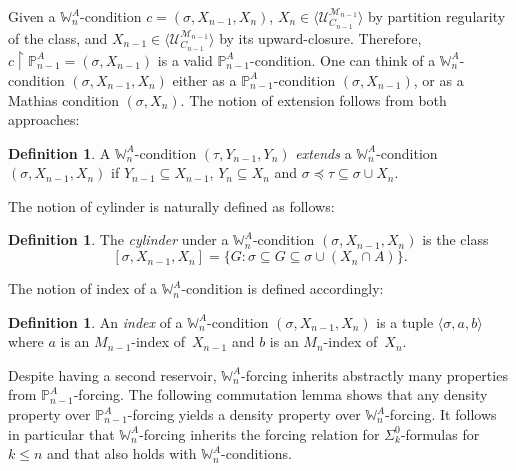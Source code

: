 \documentclass{article}
\def\PP{\mathbb{P}}
\def\WW{\mathbb{W}}
\def\U{\mathcal{U}}
\def\M{\mathcal{M}}
\def\PP{\mathbb{P}}
\newcommand{\uh}{\upharpoonright}
\numberwithin{theorem}{section}
\theoremstyle{definition}
\newtheorem{definition}[theorem]{Definition}
\begin{document}
Given a $\WW^A_n$-condition $c = (\sigma, X_{n-1}, X_n)$, $X_n \in \langle \U_{C_{n-1}}^{\M_{n-1}} \rangle$ by partition regularity of the class, and 
$X_{n - 1} \in \langle \U_{C_{n-1}}^{\M_{n-1}} \rangle$ by its upward-closure. Therefore, $c \uh {\PP^A_{n-1}} = (\sigma, X_{n-1})$ is a valid $\PP^A_{n-1}$-condition.
One can think of a $\WW^A_{n}$-condition $(\sigma, X_{n-1}, X_n)$ either as a $\PP^A_{n-1}$-condition $(\sigma, X_{n-1})$, or as a Mathias condition $(\sigma, X_n)$. The notion of extension follows from both approaches:

\begin{definition}
A $\WW^A_{n}$-condition $(\tau, Y_{n-1}, Y_n)$ \emph{extends} a $\WW^A_{n}$-condition $(\sigma, X_{n-1}, \allowbreak X_n)$
if $Y_{n-1} \subseteq X_{n-1}$, $Y_n \subseteq X_n$ and $\sigma \preceq \tau \subseteq \sigma \cup X_n$. 
\end{definition}

The notion of cylinder is naturally defined as follows:

\begin{definition}
The \emph{cylinder} under a $\WW^A_n$-condition $(\sigma, X_{n-1}, X_n)$ is the class
$$
[\sigma, X_{n-1}, X_n] = \{ G : \sigma \subseteq G \subseteq \sigma \cup (X_n \cap A) \}.
$$
\end{definition}

The notion of index of a $\WW^A_{n}$-condition is defined accordingly:

\begin{definition}
An \emph{index} of a $\WW^A_{n}$-condition $(\sigma, X_{n-1}, X_n)$ is a tuple $\langle \sigma, a, b\rangle$ where $a$ is an $M_{n-1}$-index of~$X_{n-1}$ and $b$ is an $M_n$-index of~$X_n$.
\end{definition}

Despite having a second reservoir, $\WW^A_{n}$-forcing inherits abstractly many proper\-ties from $\PP^A_{n-1}$-forcing. The following commutation lemma shows that any density property over $\PP^A_{n-1}$-forcing yields a density property over $\WW^A_{n}$-forcing. It follows in particular that $\WW^A_{n}$-forcing inherits the forcing relation for $\Sigma_k^0$-formulas for $k \leq n$ and that  also holds with $\WW^A_{n}$-conditions.
\end{document}
